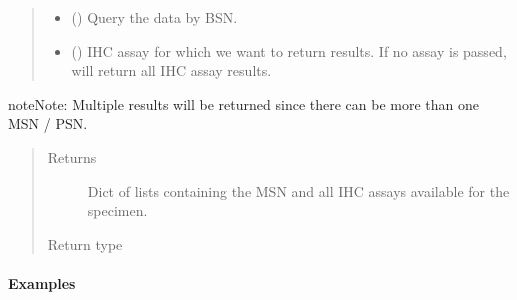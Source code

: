 \documentclass[letterpaper,10pt,english]{sphinxmanual}
\begin{document}
\begin{fulllineitems}
\begin{fulllineitems}
\begin{quote}
\begin{description}
\begin{itemize}
\item {} 
 () \textendash{} Query the data by BSN.

\item {} 
 () \textendash{} IHC assay for which we want to return results. If no
assay is passed, will return all IHC assay results.

\end{itemize}

\end{description}\end{quote}

\begin{sphinxadmonition}{note}{Note:}
Multiple results will be returned since there can be more than
one MSN / PSN.
\end{sphinxadmonition}
\begin{quote}\begin{description}
\item[{Returns}] \leavevmode
Dict of lists containing the MSN and all IHC assays available
for the specimen.

\item[{Return type}] \leavevmode
{}

\end{description}\end{quote}
\paragraph{Examples}

%
\begin{sphinxVerbatim}[commandchars=\\\{\}]
\end{sphinxVerbatim}


\end{fulllineitems}
\end{fulllineitems}
\end{document}
